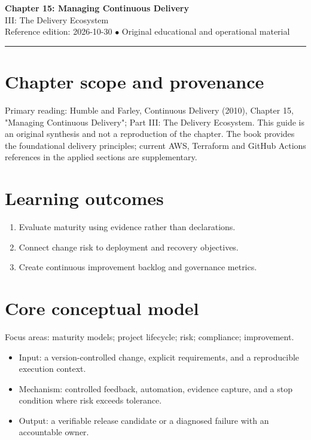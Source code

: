 \documentclass[10pt,letterpaper]{article}
\begin{document}
\begin{center}
{\LARGE\bfseries\color{cdblue}Chapter 15: Managing Continuous Delivery}\\[7pt]
{\large III: The Delivery Ecosystem}\\[6pt]
{\small Reference edition: 2026-10-30 $\bullet$ Original educational and operational material}
\end{center}
\noindent\color{cdblue}\rule{\linewidth}{1.2pt}\color{black}
\vspace{0.4em}
\section{Chapter scope and provenance}
Primary reading: Humble and Farley, Continuous Delivery (2010), Chapter 15, "Managing Continuous Delivery"; Part III: The Delivery Ecosystem. This guide is an original synthesis and not a reproduction of the chapter. The book provides the foundational delivery principles; current AWS, Terraform and GitHub Actions references in the applied sections are supplementary.


\section{Learning outcomes}
\begin{enumerate}
\item Evaluate maturity using evidence rather than declarations.
\item Connect change risk to deployment and recovery objectives.
\item Create continuous improvement backlog and governance metrics.
\end{enumerate}

\section{Core conceptual model}
Focus areas: maturity models; project lifecycle; risk; compliance; improvement.

\begin{itemize}
\item Input: a version-controlled change, explicit requirements, and a reproducible execution context.
\item Mechanism: controlled feedback, automation, evidence capture, and a stop condition where risk exceeds tolerance.
\item Output: a verifiable release candidate or a diagnosed failure with an accountable owner.
\end{itemize}
\end{document}
